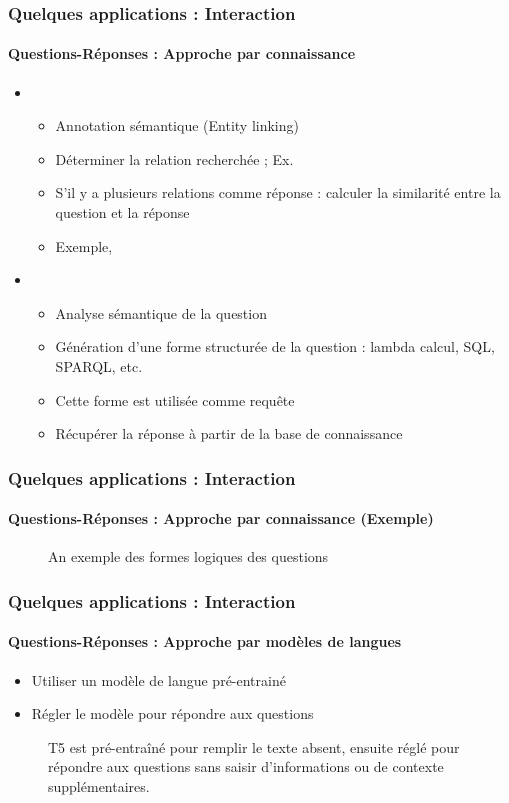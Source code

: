 \documentclass[xcolor=table]{beamer}
\begin{document}
\begin{frame}
	\frametitle{Quelques applications : Interaction}
	\framesubtitle{Questions-Réponses : Approche par connaissance}
	
	\begin{itemize}
		\item {}
		\begin{itemize}
			\item Annotation sémantique (Entity linking)
			\item Déterminer la relation recherchée ; Ex. 
			\item S'il y a plusieurs relations comme réponse : calculer la similarité entre la question et la réponse
			\item Exemple, 
		\end{itemize}
		\item {}
		\begin{itemize}
			\item Analyse sémantique de la question
			\item Génération d'une forme structurée de la question : lambda calcul, SQL, SPARQL, etc.
			\item Cette forme est utilisée comme requête
			\item Récupérer la réponse à partir de la base de connaissance
		\end{itemize}
	\end{itemize}
	
\end{frame}

\begin{frame}
	\frametitle{Quelques applications : Interaction}
	\framesubtitle{Questions-Réponses : Approche par connaissance (Exemple)}
	
	\begin{figure}
		\centering
		\caption{An exemple des formes logiques des questions \cite{2020-jurafsky-martin}}
	\end{figure}
	
\end{frame}

\begin{frame}
	\frametitle{Quelques applications : Interaction}
	\framesubtitle{Questions-Réponses : Approche par modèles de langues}
	
	\begin{itemize}
		\item Utiliser un modèle de langue pré-entrainé
		\item Régler le modèle pour répondre aux questions
	\end{itemize}

	\begin{figure}
		\centering
		\caption{T5 est pré-entraîné pour remplir le texte absent, ensuite réglé pour répondre aux questions sans saisir d'informations ou de contexte supplémentaires. \cite{2020-roberts-al}}
	\end{figure}
	
\end{frame}
\end{document}
